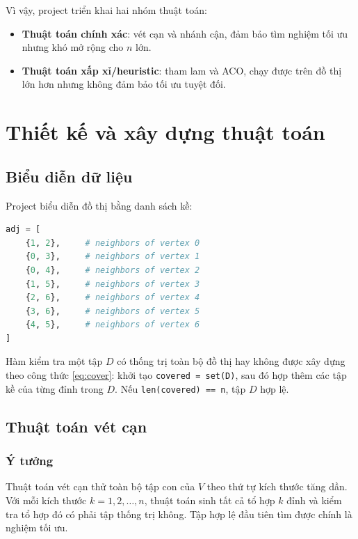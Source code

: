 \documentclass[12pt, a4paper]{report}
\begin{document}
Vì vậy, project triển khai hai nhóm thuật toán:

\begin{itemize}
  \item \textbf{Thuật toán chính xác}: vét cạn và nhánh cận, đảm bảo tìm nghiệm tối ưu nhưng khó mở rộng
    cho $n$ lớn.
  \item \textbf{Thuật toán xấp xỉ/heuristic}: tham lam và ACO, chạy được trên đồ thị lớn hơn nhưng không
    đảm bảo tối ưu tuyệt đối.
\end{itemize}

\chapter{Thiết kế và xây dựng thuật toán}

\section{Biểu diễn dữ liệu}

Project biểu diễn đồ thị bằng danh sách kề:

\begin{lstlisting}[language=Python, caption={Biểu diễn đồ thị bằng danh sách kề}]
adj = [
    {1, 2},     # neighbors of vertex 0
    {0, 3},     # neighbors of vertex 1
    {0, 4},     # neighbors of vertex 2
    {1, 5},     # neighbors of vertex 3
    {2, 6},     # neighbors of vertex 4
    {3, 6},     # neighbors of vertex 5
    {4, 5},     # neighbors of vertex 6
]
\end{lstlisting}

Hàm kiểm tra một tập $D$ có thống trị toàn bộ đồ thị hay không được xây dựng theo công thức
\ref{eq:cover}: khởi tạo \texttt{covered = set(D)}, sau đó hợp thêm các tập kề của từng đỉnh trong $D$.
Nếu \texttt{len(covered) == n}, tập $D$ hợp lệ.

\section{Thuật toán vét cạn}

\subsection{Ý tưởng}

Thuật toán vét cạn thử toàn bộ tập con của $V$ theo thứ tự kích thước tăng dần. Với mỗi kích thước
$k=1,2,\ldots,n$, thuật toán sinh tất cả tổ hợp $k$ đỉnh và kiểm tra tổ hợp đó có phải tập thống trị
không. Tập hợp lệ đầu tiên tìm được chính là nghiệm tối ưu.
\end{document}
